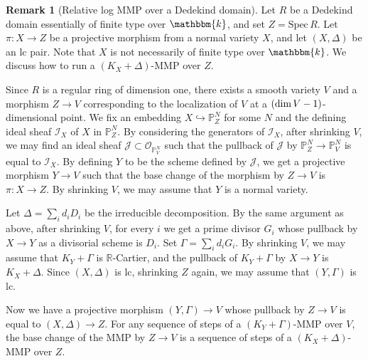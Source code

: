 \documentclass[12pt,twoside]{amsart}
\theoremstyle{definition}
\newtheorem{rem}[thm]{Remark}
\begin{document}
\begin{rem}[Relative log MMP over a Dedekind domain]\label{rem-mmp-over-local-rings}
Let $R$ be a Dedekind domain essentially of finite type over $\mathbbm{k}$, and set $Z= \mathrm{Spec}\, R$. 
Let $\pi \colon X \to Z$ be a projective morphism from a normal variety $X$, and let $(X,\Delta)$ be an lc pair. 
Note that $X$ is not necessarily of finite type over $\mathbbm{k}$. 
We discuss how to run a $(K_{X}+\Delta)$-MMP over $Z$. 

Since $R$ is a regular ring of dimension one, there exists a smooth variety $V$ and a morphism $Z \to V$ corresponding to the localization of $V$ at a $({\rm dim}\,V-1)$-dimensional point. 
We fix an embedding $X \hookrightarrow \mathbb{P}^{N}_{Z}$ for some $N$ and the defining ideal sheaf $\mathcal{I}_{X}$ of $X$ in $\mathbb{P}^{N}_{Z}$. 
By considering the generators of $\mathcal{I}_{X}$, after shrinking $V$, we may find an ideal sheaf $\mathcal{J} \subset \mathcal{O}_{\mathbb{P}^{N}_{V}}$ such that the pullback of $\mathcal{J}$ by $\mathbb{P}^{N}_{Z} \to \mathbb{P}^{N}_{V}$ is equal to $\mathcal{I}_{X}$. 
By defining $Y$ to be the scheme defined by $\mathcal{J}$, we get a projective morphism $Y \to V$ such that the base change of the morphism by $Z \to V$ is $\pi \colon X \to Z$. 
By shrinking $V$, we may assume that $Y$ is a normal variety. 

Let $\Delta=\sum_{i}d_{i}D_{i}$ be the irreducible decomposition. 
By the same argument as above, after shrinking $V$, for every $i$ we get a prime divisor $G_{i}$ whose pullback by $X \to Y$ as a divisorial scheme is $D_{i}$. 
Set $\Gamma=\sum_{i}d_{i}G_{i}$. 
By shrinking $V$, we may assume that $K_{Y}+\Gamma$ is $\mathbb{R}$-Cartier, and the pullback of $K_{Y}+\Gamma$ by $X \to Y$ is $K_{X}+\Delta$. 
Since $(X,\Delta)$ is lc, shrinking $Z$ again, we may assume that $(Y,\Gamma)$ is lc. 

Now we have a projective morphism $(Y,\Gamma) \to V$ whose pullback by $Z \to V$ is equal to $(X,\Delta) \to Z$. 
For any sequence of steps of a $(K_{Y}+\Gamma)$-MMP over $V$, the base change of the MMP by $Z \to V$ is a sequence of steps of a $(K_{X}+\Delta)$-MMP over $Z$.  
\end{rem}
\end{document}
